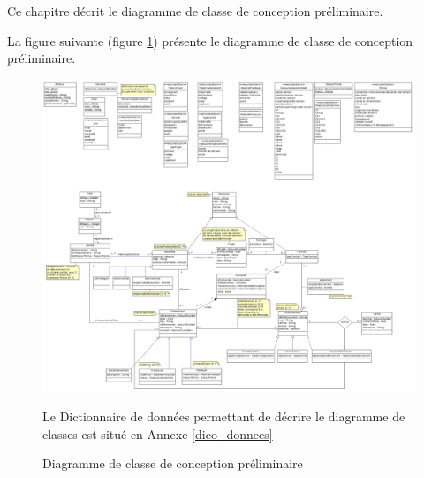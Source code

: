 Ce chapitre décrit le diagramme de classe de conception préliminaire.

La figure suivante (figure \ref{diagrammeClasse}) présente le diagramme de classe de conception préliminaire.
\begin{figure}[H]
	\centering
	\includegraphics[scale=0.25]{images/diagrammeClasses/images/diagrammeDeClasses.png}
	\caption{Diagramme de classe de conception préliminaire}
	\label{diagrammeClasse}
	Le Dictionnaire de données permettant de décrire le diagramme de classes est situé en Annexe \ref{dico_donnees} 
\end{figure}